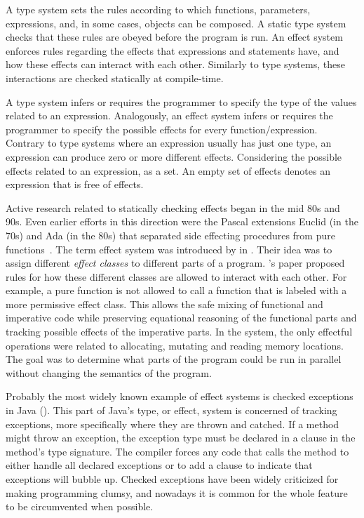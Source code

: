 A type system sets the rules according to which functions, parameters, expressions, and, in some cases, objects can be composed. A static type system checks that these rules are obeyed before the program is run. An effect system enforces rules regarding the effects that expressions and statements have, and how these effects can interact with each other. Similarly to type systems, these interactions are checked statically at compile-time.

A type system infers or requires the programmer to specify the type of the values related to an expression. Analogously, an effect system infers or requires the programmer to specify the possible effects for every function/expression. Contrary to type systems where an expression usually has just one type, an expression can produce zero or more different effects. Considering the possible effects related to an expression, as a set. An empty set of effects denotes an expression that is free of effects.

Active research related to statically checking effects began in the mid 80s and 90s. Even earlier efforts in this direction were the Pascal extensions Euclid (in the 70s) and Ada (in the 80s) that separated side effecting procedures from pure functions~\cite{real-prog-in-fp}. The term effect system was introduced by \textcite{intgr-fp-ip} in \citeyear{intgr-fp-ip}. Their idea was to assign different \textit{effect classes} to different parts of a program. \citeauthor{intgr-fp-ip}'s paper proposed rules for how these different classes are allowed to interact with each other. For example, a pure function is not allowed to call a function that is labeled with a more permissive effect class. This allows the safe mixing of functional and imperative code while preserving equational reasoning of the functional parts and tracking possible effects of the imperative parts. In the system, the only effectful operations were related to allocating, mutating and reading memory locations. The goal was to determine what parts of the program could be run in parallel without changing the semantics of the program.

Probably the most widely known example of effect systems is checked exceptions in Java (). This part of Java's type, or effect, system is concerned of tracking exceptions, more specifically where they are thrown and catched. If a method might throw an exception, the exception type must be declared in a  clause in the method's type signature. The compiler forces any code that calls the method to either handle all declared exceptions or to add a  clause to indicate that exceptions will bubble up. Checked exceptions have been widely criticized for making programming clumsy, and nowadays it is common for the whole feature to be circumvented when possible.

